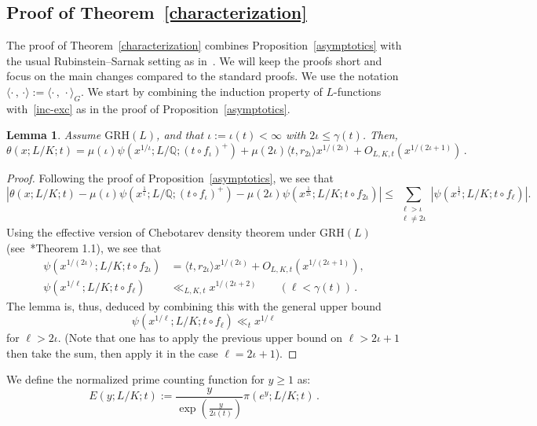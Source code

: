 \documentclass[12pt]{amsart}
\numberwithin{equation}{section}
\newcommand{\Q}{\mathbb Q}
\newtheorem{lem}[X]{Lemma}
\theoremstyle{definition}
\theoremstyle{remark}
\begin{document}
\subsection{Proof of Theorem~\ref{characterization}}
The proof of Theorem~\ref{characterization} combines Proposition~\ref{asymptotics} with the usual Rubinstein--Sarnak setting as in~\cites{RS94,Dev,FJ,Ng}. We will keep the proofs short and focus on the main changes compared to the standard proofs. We use the notation $\langle\cdot\, ,\, \cdot\rangle:=\langle\cdot\, ,\, \cdot\rangle_G$. We start by combining the induction property of $L$-functions with~\eqref{inc-exc} as in the proof of Proposition~\ref{asymptotics}.
\begin{lem}\label{theta_expansion}
    Assume $\mathrm{GRH}(L)$, and that $\iota := \iota(t) < \infty$ with $2\iota \le \gamma(t)$. Then,
    \[ \theta(x; L/K; t) = \mu(\iota) \psi\left(x^{1/\iota}; L/\Q; (t \circ f_\iota)^+\right) + \mu(2\iota)\langle t, r_{2\iota} \rangle x^{1/(2\iota)} + O_{L,K,t}\left(x^{1/(2\iota+1)}\right)\, .\]
\end{lem}
\begin{proof}
    Following the proof of Proposition~\ref{asymptotics}, we see that 
    \[\left|\theta(x;L/K;t)-\mu(\iota)\psi\left(x^{\frac{1}{\iota}}; L/\Q; (t \circ f_\iota)^+\right)-\mu(2\iota)\psi\left(x^{\frac{1}{2\iota}};L/K;t\circ f_{2\iota} \right)\right|\le \sum_{\substack{\ell>\iota\\\ell\ne 2\iota}}\left|\psi\left(x^{\frac{1}{\ell}};L/K;t\circ f_\ell\right)\right|.\]
    Using the effective version of Chebotarev density theorem under $\mathrm{GRH}(L)$ (see~\cite{LO}*{Theorem 1.1}), we see that
    \begin{align*}
        \psi\left(x^{1/(2\iota)};L/K;t\circ f_{2\iota} \right)&=\langle t,r_{2\iota}\rangle x^{1/(2\iota)}+O_{L,K,t}\left(x^{1/(2\iota+1)}\right),\\
        \psi\left(x^{1/\ell};L/K;t\circ f_\ell\right)&\ll_{L,K,t} x^{1/(2\iota+2)}\qquad (\ell<\gamma(t))\, .
    \end{align*}
    The lemma is, thus, deduced by combining this with the general upper bound \[\psi\left(x^{1/\ell};L/K;t\circ f_\ell\right)\ll_t x^{1/\ell}\] for $\ell>2\iota$. (Note that one has to apply the previous upper bound on $\ell>2\iota+1$ then take the sum, then apply it in the case $\ell=2\iota+1$).
\end{proof}
We define the normalized prime counting function for $y \ge 1$ as:
\begin{equation}
    E(y;L/K;t) := \frac{y}{\exp\left(\frac{y}{2\iota(t)}\right)} \pi(e^y; L/K; t)\, .
\end{equation}
\end{document}
